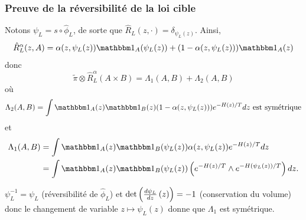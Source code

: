 \documentclass[10pt]{beamer}
\begin{document}
\begin{frame}
  \frametitle{Preuve de la réversibilité de la loi cible}
	
		\small
		Notons $\psi_L = s \circ \hat \phi_L$, de sorte que $\hat R_L(z,\cdot) = \delta_{\psi_L(z)}$. Ainsi,
		$$
		\hat R_L^\alpha(z,A) = \alpha(z,\psi_L(z)) \ind_A(\psi_L(z)) + (1-\alpha(z,\psi_L(z))) \ind_A(z)
		$$
		donc
		$$
		\widetilde \pi \otimes \hat R_L^\alpha (A \times B)
		=
		\Lambda_1(A,B) + \Lambda_2(A,B)
		$$
		où
		$$
		\Lambda_2(A,B) = \int \ind_A(z) \ind_B(z) (1-\alpha(z,\psi_L(z))) e^{-H(z)/T} dz \text{ est sym\'etrique}
		$$
		et
		$$
		\begin{aligned}
		\Lambda_1(A,B)
		&= \int \ind_A(z) \ind_B(\psi_L(z)) \alpha(z,\psi_L(z)) e^{-H(z)/T} dz\\
		&= \int \ind_A(z) \ind_B(\psi_L(z)) \left( e^{-H(z)/T} \wedge e^{-H(\psi_L(z))/T} \right) dz.
		\end{aligned}
		$$

		$\psi_L^{-1} = \psi_L$ (réversibilité de $\hat \phi_L$) et $\det \left( \frac{d \psi_L}{d z} \left( z \right) \right) = -1$ (conservation du volume) donc le changement de variable $z \mapsto \psi_L(z)$ donne que $\Lambda_1$ est symétrique.
	\null\hfill\qedsymbol
\end{frame}
 
\end{document}
